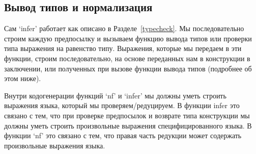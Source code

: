 \pagebreak
\subsection{Вывод типов и нормализация}\label{nf_infer}
Сам `infer' работает как описано в Разделе~\ref{typecheck}. Мы последовательно строим каждую предпосылку и вызываем функцию вывода типов или проверки типа выражения на равенство типу. Выражения, которые мы передаем в эти функции, строим последовательно, на основе переданных нам в конструкции в заключении, или полученных при вызове функции вывода типов (подробнее об этом ниже).

Внутри кодогенерации функций `nf' и `infer' мы должны уметь строить выражения языка, который мы проверяем/редуцируем. В функции infer это связано с тем, что при проверке предпосылок и возврате типа конструкции мы должны уметь строить произвольные выражения специфицированного языка. В функции `nf' это связано с тем, что правая часть редукции может содержать произвольные выражения языка.



